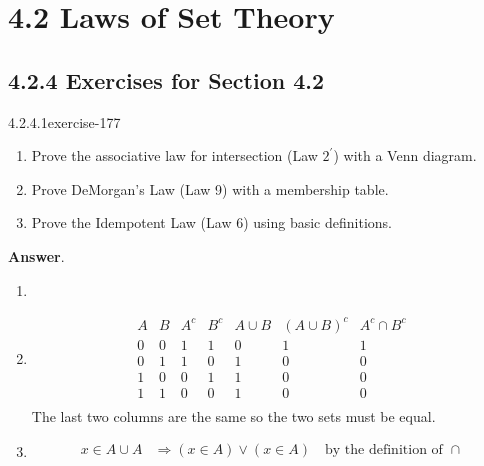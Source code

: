 \documentclass[twoside,10pt,]{book}
\numberwithin{equation}{section}
\begin{document}
\section*{4.2 Laws of Set Theory}
\subsection*{4.2.4 Exercises for Section 4.2}
\begin{divisionsolution}{4.2.4.1}{}{exercise-177}%
\hypertarget{p-1592}{}%
\leavevmode%
\begin{enumerate}[label=(\alph*)]
\item\hypertarget{li-839}{}Prove the associative law for intersection (Law \(2^{\prime}\)) with a Venn diagram.%
\item\hypertarget{li-840}{}Prove DeMorgan's Law (Law 9) with a membership table.%
\item\hypertarget{li-841}{}Prove the Idempotent Law (Law 6) using basic definitions.%
\end{enumerate}
%
\par\smallskip%
\noindent\textbf{Answer}.\quad%
\hypertarget{p-1593}{}%
\leavevmode%
\begin{enumerate}[label=(\alph*)]
\item\hypertarget{li-842}{}\hypertarget{p-1594}{}%
%
\item\hypertarget{li-843}{}\hypertarget{p-1595}{}%
%
\begin{equation*}
\begin{array}{ccccccc}
A & B &A^c & B^c & A\cup B & (A\cup B)^c &A^c\cap B^c \\
\hline
0 & 0 &1 &  1 &  0 &  1 &  1 \\
0 & 1 &1 &  0 &  1 &  0 &  0 \\
1 & 0 & 0 &  1 &  1 &  0 &  0 \\
1 & 1 & 0 &  0 &  1 &  0 &  0 \\
\end{array}
\end{equation*}
The last two columns are the same so the two sets must be equal.%
\item\hypertarget{li-844}{}\hypertarget{p-1596}{}%
%
\begin{equation*}
\begin{split}
x\in A\cup A & \Rightarrow  (x\in A) \lor (x\in A)\quad\textrm{by the definition of } \cap\\

\end{split}
\end{equation*}
\end{enumerate}
\end{divisionsolution}
\end{document}
